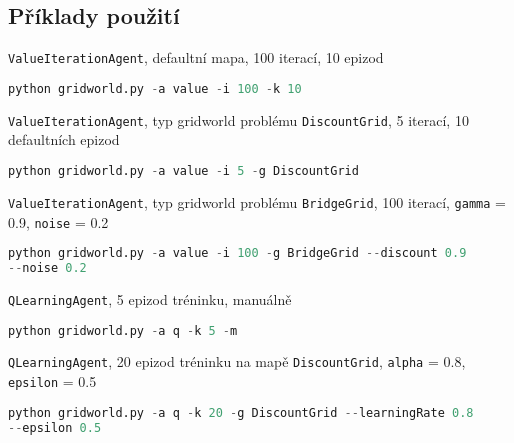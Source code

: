 \subsection{Příklady použití}
\texttt{ValueIterationAgent}, defaultní mapa, 100 iterací, 10 epizod
\begin{lstlisting}[language=Python,texcl=true]
python gridworld.py -a value -i 100 -k 10
\end{lstlisting}
\texttt{ValueIterationAgent}, typ gridworld problému \texttt{DiscountGrid}, 5 iterací, 10 defaultních epizod
\begin{lstlisting}[language=Python,texcl=true]
python gridworld.py -a value -i 5 -g DiscountGrid
\end{lstlisting}
\texttt{ValueIterationAgent}, typ gridworld problému \texttt{BridgeGrid}, 100 iterací, \texttt{gamma} = 0.9, \texttt{noise} =  0.2
\begin{lstlisting}[language=Python,texcl=true]
python gridworld.py -a value -i 100 -g BridgeGrid --discount 0.9
--noise 0.2
\end{lstlisting}
\texttt{QLearningAgent}, 5 epizod tréninku, manuálně
\begin{lstlisting}[language=Python,texcl=true]
python gridworld.py -a q -k 5 -m
\end{lstlisting}
\texttt{QLearningAgent}, 20 epizod tréninku na mapě \texttt{DiscountGrid},  \texttt{alpha} = 0.8, \texttt{epsilon} = 0.5
\begin{lstlisting}[language=Python,texcl=true]
python gridworld.py -a q -k 20 -g DiscountGrid --learningRate 0.8
--epsilon 0.5
\end{lstlisting}

